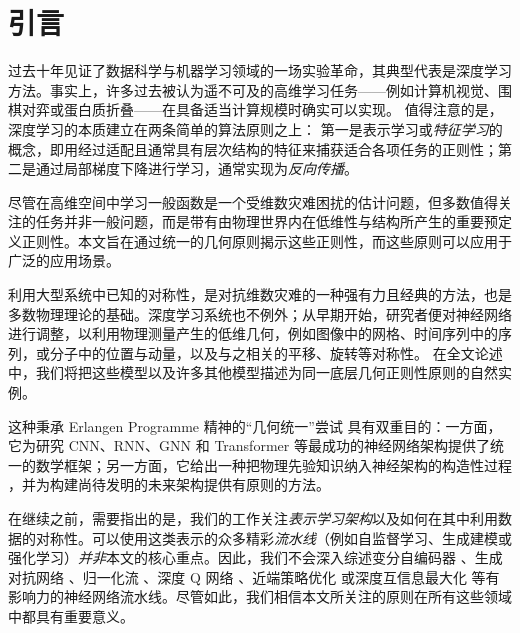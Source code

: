 
\section{引言}                %

过去十年见证了数据科学与机器学习领域的一场实验革命，其典型代表是深度学习方法。事实上，许多过去被认为遥不可及的高维学习任务——例如计算机视觉、围棋对弈或蛋白质折叠——在具备适当计算规模时确实可以实现。
%
值得注意的是，深度学习的本质建立在两条简单的算法原则之上：
第一是表示学习或\emph{特征学习}的概念，即用经过适配且通常具有层次结构的特征来捕获适合各项任务的正则性；第二是通过局部梯度下降进行学习，通常实现为{\em 反向传播}。%

尽管在高维空间中学习一般函数是一个受维数灾难困扰的估计问题，但多数值得关注的任务并非一般问题，而是带有由物理世界内在低维性与结构所产生的重要预定义正则性。本文旨在通过统一的几何原则揭示这些正则性，而这些原则可以应用于广泛的应用场景。

利用大型系统中已知的对称性，是对抗维数灾难的一种强有力且经典的方法，也是多数物理理论的基础。深度学习系统也不例外；从早期开始，研究者便对神经网络进行调整，以利用物理测量产生的低维几何，例如图像中的网格、时间序列中的序列，或分子中的位置与动量，以及与之相关的平移、旋转等对称性。
在全文论述中，我们将把这些模型以及许多其他模型描述为同一底层几何正则性原则的自然实例。%

这种秉承 Erlangen Programme 精神的“几何统一”尝试
具有双重目的：一方面，它为研究 CNN、RNN、GNN 和 Transformer 等最成功的神经网络架构提供了统一的数学框架；另一方面，它给出一种把物理先验知识纳入神经架构的构造性过程%
，并为构建尚待发明的未来架构提供有原则的方法。

在继续之前，需要指出的是，我们的工作关注\emph{表示学习架构}以及如何在其中利用数据的对称性。可以使用这类表示的众多精彩\emph{流水线}（例如自监督学习、生成建模或强化学习）\emph{并非}本文的核心重点。因此，我们不会深入综述变分自编码器 \citep{kingma2013auto}、生成对抗网络 \citep{goodfellow2014generative}、归一化流 \citep{rezende2015variational}、深度 Q 网络 \citep{mnih2015human}、近端策略优化 \citep{schulman2017proximal} 或深度互信息最大化 \citep{hjelm2018learning} 等有影响力的神经网络流水线。尽管如此，我们相信本文所关注的原则在所有这些领域中都具有重要意义。

